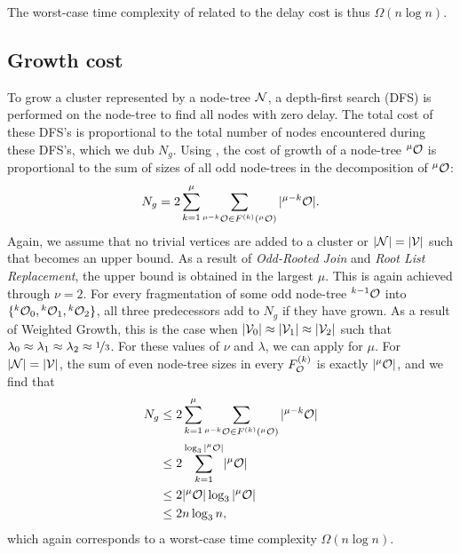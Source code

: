 The worst-case time complexity of related to the delay cost is thus $\Omega(n\log{n})$. 

\subsection{Growth cost}\label{sec:growthcost}

To grow a cluster represented by a node-tree $\mathcal{N}$, a depth-first search (DFS) is performed on the node-tree to find all nodes with zero delay. The total cost of these DFS's is proportional to the total number of nodes encountered during these DFS's, which we dub $N_g$. Using , the cost of growth of a node-tree ${}^{\mu}\mathcal{O}$ is proportional to the sum of sizes of all odd node-trees in the decomposition of ${}^{\mu}\mathcal{O}$: 
\begin{equation}\label{eq:ngrow}
  N_g = 2\sum_{k=1}^\mu{ \sum_{  {}^{\mu-k} \mathcal{O}\in F^{(k)}( {}^{\mu} \mathcal{O}) }{ \lvert {}^{\mu-k} \mathcal{O}\rvert} }.
\end{equation}
Again, we assume that no trivial vertices are added to a cluster or $|\mathcal{N}| = |\mathcal{V}|$ such that  becomes an upper bound. As a result of \emph{Odd-Rooted Join} and \emph{Root List Replacement}, the upper bound is obtained in the largest $\mu$. This is again achieved through $\nu = 2$. For every fragmentation of some odd node-tree ${}^{k-1}\mathcal{O}$ into $\{{}^{k}\mathcal{O}_0, {}^{k}\mathcal{O}_1, {}^{k}\mathcal{O}_2\}$, all three predecessors add to $N_g$ if they have grown. As a result of Weighted Growth, this is the case when $\lvert\mathcal{V}_0\rvert\approx \lvert\mathcal{V}_1\rvert\approx\lvert\mathcal{V}_2\rvert$ such that $\lambda_0 \approx \lambda_1 \approx \lambda_2\approx \nicefrac{1}{3}$. For these values of $\nu$ and $\lambda$, we can apply  for $\mu$. For $|\mathcal{N}| = |\mathcal{V}|$, the sum of even node-tree sizes in every $F_{\mathcal{O}}^{(k)}$ is exactly $\lvert{}^{\mu}\mathcal{O}\rvert$, and we find that
\begin{align*}
  \nonumber N_g &\leq 2\sum_{k=1}^\mu{ \sum_{  {}^{\mu-k} \mathcal{O}\in F^{(k)}( {}^{\mu} \mathcal{O}) }{ \lvert {}^{\mu-k} \mathcal{O}\rvert}  } \\
  \nonumber         &\leq 2\sum_{k=1}^{\log_3{\lvert{}^{\mu}\mathcal{O}\rvert}} \lvert{}^{\mu}\mathcal{O}\rvert\\
                    &\leq 2\lvert{}^{\mu}\mathcal{O}\rvert\log_3{\lvert{}^{\mu}\mathcal{O}\rvert}\\
                    &\leq 2 n \log_3{n},
\end{align*}
which again corresponds to a worst-case time complexity $\Omega(n\log{n})$.